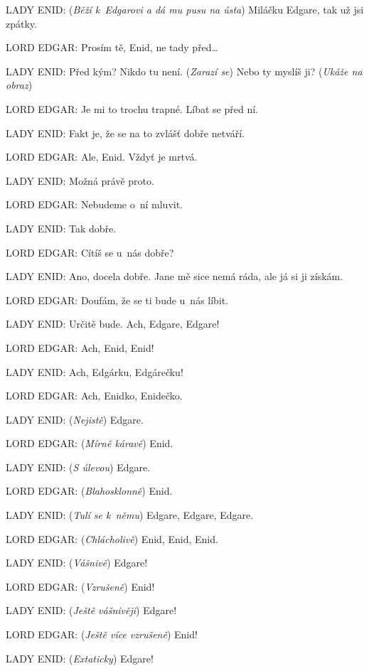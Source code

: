 \noindent
LADY ENID: (\textit{Běží k Edgarovi a dá mu pusu na ústa}) Miláčku Edgare, tak už jsi zpátky.

\noindent
LORD EDGAR: Prosím tě, Enid, ne tady před\ldots

\noindent
LADY ENID: Před kým? Nikdo tu není. (\textit{Zarazí se}) Nebo ty myslíš ji? (\textit{Ukáže na obraz})

\noindent
LORD EDGAR: Je mi to trochu trapné. Líbat se před ní.

\noindent
LADY ENID: Fakt je, že se na to zvlášť dobře netváří.

\noindent
LORD EDGAR: Ale, Enid. Vždyť je mrtvá.

\noindent
LADY ENID: Možná právě proto.

\noindent
LORD EDGAR: Nebudeme o~ní mluvit.

\noindent
LADY ENID: Tak dobře.

\noindent
LORD EDGAR: Cítíš se u~nás dobře?

\noindent
LADY ENID: Ano, docela dobře. Jane mě sice nemá ráda, ale já si ji získám.

\noindent
LORD EDGAR: Doufám, že se ti bude u~nás líbit.

\noindent
LADY ENID: Určitě bude. Ach, Edgare, Edgare!

\noindent
LORD EDGAR: Ach, Enid, Enid!

\noindent
LADY ENID: Ach, Edgárku, Edgárečku!

\noindent
LORD EDGAR: Ach, Enidko, Enidečko.

\noindent
LADY ENID: (\textit{Nejistě}) Edgare.

\noindent
LORD EDGAR: (\textit{Mírně káravě}) Enid.

\noindent
LADY ENID: (\textit{S úlevou}) Edgare.

\noindent
LORD EDGAR: (\textit{Blahosklonně}) Enid.

\noindent
LADY ENID: (\textit{Tulí se k němu}) Edgare, Edgare, Edgare.

\noindent
LORD EDGAR: (\textit{Chlácholivě}) Enid, Enid, Enid.

\noindent
LADY ENID: (\textit{Vášnivě}) Edgare!

\noindent
LORD EDGAR: (\textit{Vzrušeně}) Enid!

\noindent
LADY ENID: (\textit{Ještě vášnivěji}) Edgare!

\noindent
LORD EDGAR: (\textit{Ještě více vzrušeně}) Enid!

\noindent
LADY ENID: (\textit{Extaticky}) Edgare!

